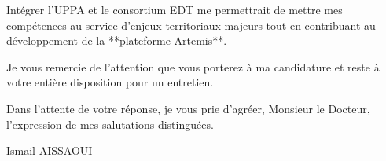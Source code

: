 \documentclass[11pt,a4paper]{article}
\begin{document}
Intégrer l'UPPA et le consortium EDT me permettrait de mettre mes compétences au service d'enjeux territoriaux majeurs tout en contribuant au développement de la **plateforme Artemis**.

Je vous remercie de l'attention que vous porterez à ma candidature et reste à votre entière disposition pour un entretien.

Dans l'attente de votre réponse, je vous prie d'agréer, Monsieur le Docteur, l'expression de mes salutations distinguées.

\bigskip

\noindent Ismail AISSAOUI
\end{document}
